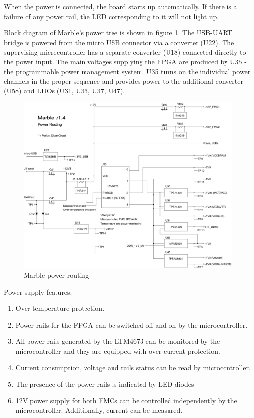 \documentclass[12pt,oneside,a4]{article}
\begin{document}
When the power is connected, the board starts up automatically. If there is a failure of any power rail, the LED corresponding to it will not light up.

Block diagram of Marble's power tree is shown in figure \ref{pwr}. The USB-UART bridge is powered from the micro USB connector via a converter (U22). The supervising microcontroller has a separate converter (U18) connected directly to the power input. The main voltages supplying the FPGA are produced by U35 - the programmable power management system. U35 turns on the individual power channels in the proper sequence and provides power to the additional converter (U58) and LDOs (U31, U36, U37, U47).

\begin{figure}[H]
\begin{center}
\includegraphics[width=1.0\linewidth]{m_power.png}
 \caption{Marble power routing}\label{pwr}
\end{center}
\end{figure}

Power supply features:
\begin{enumerate}
	\item Over-temperature protection.
	\item Power rails for the FPGA can be switched off and on by the microcontroller.
	\item All power rails generated by the LTM4673 can be monitored by the microcontroller and they are equipped with over-current protection.
	\item Current consumption, voltage and rails status can be read by microcontroller.
	\item The presence of the power rails is indicated by LED diodes
	\item 12V power supply for both FMCs can be controlled independently by the microcontroller. Additionally,  current can be measured.
\end{enumerate}
\end{document}
